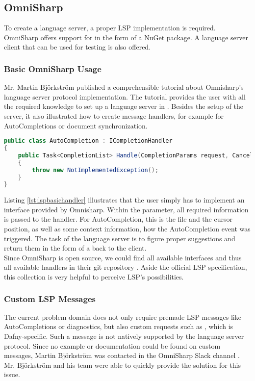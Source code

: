 \subsection{OmniSharp}
\label{section:analysis:omnisharp}
To create a language server, a proper LSP implementation is required.
OmniSharp offers support for \CsharpWithSpace \cite{langserverdotorg} in the form of a NuGet package.
A language server client that can be used for testing is also offered.

\subsubsection{Basic OmniSharp Usage}
Mr. Martin Bj\"orkstr\"om published a comprehensible tutorial about Omnisharp's language server protocol implementation.
The tutorial provides the user with all the required knowledge to set up a language server in \Csharp.
Besides the setup of the server, it also illustrated how to create message handlers, for example for AutoCompletions or document synchronization.\\

\begin{lstlisting}[language=csharp, caption={LSP Handler Implementation}, captionpos=b, label={lst:lspbasichandler}]
public class AutoCompletion : ICompletionHandler
{
    public Task<CompletionList> Handle(CompletionParams request, CancellationToken cancellationToken)
    {
        throw new NotImplementedException();
    }
}
\end{lstlisting}

Listing \ref{lst:lspbasichandler} illustrates that the user simply has to implement an interface provided by Omnisharp.
Within the  parameter, all required information is passed to the handler.
For AutoCompletion, this is the file and the cursor position, as well as some context information, how the AutoCompletion event was triggered.
The task of the language server is to figure proper suggestions and return them in the form of a  back to the client.\\

Since OmniSharp is open source, we could find all available interfaces and thus all available handlers in their git repository \cite{omnisharpgit}.
Aside the official LSP specification, this collection is very helpful to perceive LSP's possibilities.

\subsubsection{Custom LSP Messages}
\label{chapter:customlspmsg}
The current problem domain does not only require premade LSP messages like AutoCompletions or diagnostics, but also custom requests such as , which is Dafny-specific.
Such a message is not natively supported by the language server protocol.
Since no example or documentation could be found on custom messages, Martin Bj\"orkstr\"om was contacted in the OmniSharp Slack channel \cite{omnisharpslack}.
Mr. Bj\"orkstr\"om and his team were able to quickly provide the solution for this issue.\\

